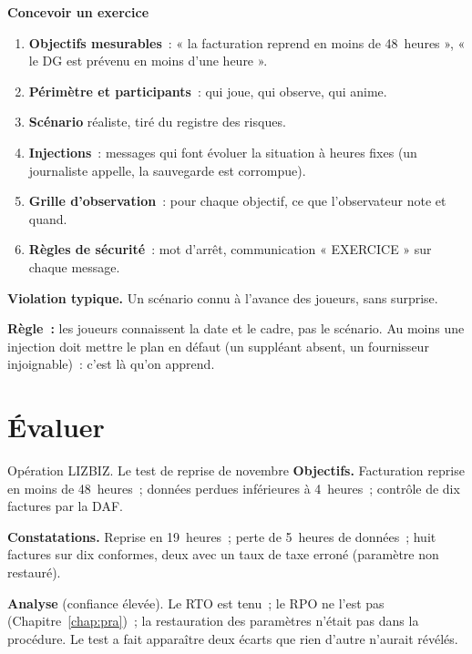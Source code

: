 \begin{boxprocedure}
\textbf{Concevoir un exercice}
\begin{enumerate}
    \item \textbf{Objectifs mesurables}~: « la facturation reprend en moins
          de 48~heures », « le DG est prévenu en moins d'une heure ».
    \item \textbf{Périmètre et participants}~: qui joue, qui observe, qui
          anime.
    \item \textbf{Scénario} réaliste, tiré du registre des risques.
    \item \textbf{Injections}~: messages qui font évoluer la situation à
          heures fixes (un journaliste appelle, la sauvegarde est corrompue).
    \item \textbf{Grille d'observation}~: pour chaque objectif, ce que
          l'observateur note et quand.
    \item \textbf{Règles de sécurité}~: mot d'arrêt, communication
          « EXERCICE » sur chaque message.
\end{enumerate}
\end{boxprocedure}

\begin{boxalert}
\textbf{Violation typique.} Un scénario connu à l'avance des joueurs, sans
surprise.

\smallskip
\textbf{Règle~:} les joueurs connaissent la date et le cadre, pas le
scénario. Au moins une injection doit mettre le plan en défaut (un
suppléant absent, un fournisseur injoignable)~: c'est là qu'on apprend.
\end{boxalert}

\section{Évaluer}
\label{sec:c20-evaluer}

\begin{boxscenario}{Opération LIZBIZ. Le test de reprise de novembre}
\textbf{Objectifs.} Facturation reprise en moins de 48~heures~; données
perdues inférieures à 4~heures~; contrôle de dix factures par la DAF.

\medskip
\textbf{Constatations.} Reprise en 19~heures~; perte de 5~heures de
données~; huit factures sur dix conformes, deux avec un taux de taxe
erroné (paramètre non restauré).

\medskip
\textbf{Analyse} (confiance élevée). Le RTO est tenu~; le RPO ne l'est pas
(Chapitre~\ref{chap:pra})~; la restauration des paramètres n'était pas
dans la procédure. Le test a fait apparaître deux écarts que rien d'autre
n'aurait révélés.
\end{boxscenario}

